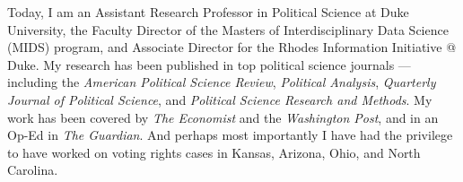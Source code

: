 \documentclass[12pt]{article}
\begin{document}
Today, I am an Assistant Research Professor in Political Science at Duke
University, the Faculty Director of the Masters of Interdisciplinary
Data Science (MIDS) program, and Associate Director for the Rhodes
Information Initiative @ Duke. My research has been published in top
political science journals --- including the \emph{American Political
Science Review}, \emph{Political Analysis}, \emph{Quarterly Journal of
Political Science}, and \emph{Political Science Research and Methods}.
My work has been covered by \emph{The Economist} and the
\emph{Washington Post}, and in an Op-Ed in \emph{The Guardian}. And
perhaps most importantly I have had the privilege to have worked on
voting rights cases in Kansas, Arizona, Ohio, and North Carolina.

\end{document}
